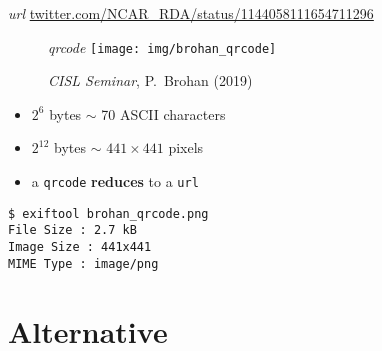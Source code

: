 \documentclass{beamer}
\begin{document}
\begin{frame}[fragile]
  \begin{beamerboxesrounded}{\textit{url}}
        \url{twitter.com/NCAR\_RDA/status/1144058111654711296}
  \end{beamerboxesrounded}

  \begin{minipage}[t]{0.43\linewidth}
      \begin{figure}
      \textit{qrcode}
          \texttt{[image: img/brohan\_qrcode]}
          \caption{
            \emph{CISL Seminar}, P.~Brohan (2019)
          }
      \end{figure}
  \end{minipage}
  \begin{minipage}[t]{0.55\linewidth}
      \begin{example}
      \begin{itemize}
        \item $2^6$ bytes $\sim$ 70 ASCII characters
        \item $2^{12}$ bytes $\sim$ $441 \times 441$ pixels
        \item a \texttt{qrcode} \textbf{reduces} to a \texttt{url}
      \end{itemize}
    \end{example}

\begin{verbatim}
$ exiftool brohan_qrcode.png
File Size : 2.7 kB
Image Size : 441x441
MIME Type : image/png
\end{verbatim}
\end{minipage}
\end{frame}

\section{Alternative}
\end{document}
